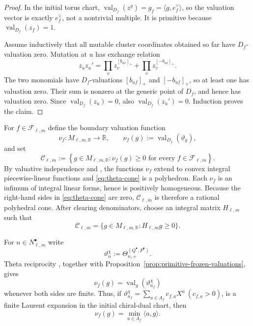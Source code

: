 \documentclass[11pt]{amsart}
\theoremstyle{definition}
\theoremstyle{remark}
\begin{document}
\begin{proof}
In the initial torus chart,
$\operatorname{val}_{D_f}(z^g)=g_f=\langle g,e_f^\vee\rangle$, 
so the valuation vector is exactly $e_f^\vee$, not a nontrivial multiple.
It is primitive because $\operatorname{val}_{D_f}(z_f)=1$.

Assume inductively that all mutable cluster coordinates obtained so far
have $D_f$-valuation zero.  Mutation at $u$
has exchange relation
\[ z_uz_u' =\prod_vz_v^{[b_{uv}]_+} +\prod_vz_v^{[-b_{uv}]_+}. \]
The two monomials have $D_f$-valuations $[b_{uf}]_+$ and
$[-b_{uf}]_+$, so at least one has valuation zero.  Their sum is nonzero at
the generic point of $D_f$, and hence has valuation zero.  Since
$\operatorname{val}_{D_f}(z_u)=0$, also
$\operatorname{val}_{D_f}(z_u')=0$.  Induction proves the claim.
\end{proof}

For $f\in\mathscr F_{\ell,m}$ define the boundary valuation function
\[ \nu_f:M_{\ell,m,\mathbb R}\longrightarrow\mathbb R, \qquad \nu_f(g):=\operatorname{val}_{D_f}(\vartheta_g), \]
and set
\begin{equation}
 \mathscr C_{\ell,m}
 :=\left\{g\in M_{\ell,m,\mathbb R}:
   \nu_f(g)\ge0\text{ for every }f\in\mathscr F_{\ell,m}\right\}.
 \label{eq:theta-cone}
\end{equation}
By valuative independence and
\cite[Theorem~1.1 and Corollary~1.2]{CMMM}, the functions $\nu_f$ extend to
convex integral piecewise-linear functions and \eqref{eq:theta-cone} is a
polyhedron.  Each $\nu_f$ is an infimum of integral linear forms, hence is
positively homogeneous.  Because the right-hand sides in
\eqref{eq:theta-cone} are zero, $\mathscr C_{\ell,m}$ is therefore a rational
polyhedral cone.  After clearing denominators, choose an integral matrix
$H_{\ell,m}$ such that
\[ \mathscr C_{\ell,m} =\{g\in M_{\ell,m,\mathbb R}:H_{\ell,m}g\ge0\}. \]

For $n\in N_{\ell,m}^{\bullet}$ write
\[ \vartheta_n^{\chi}:=\Theta_{n,+}^{(Q^{\bullet},P^{\bullet})}. \]
Theta reciprocity \cite[Claim~4.16 and Theorem~5.19]{CMMM}, together with
Proposition~\ref{prop:primitive-frozen-valuations}, gives
\[ \nu_f(g)=\operatorname{val}_{g}(\vartheta_{n_f}^{\chi}) \]
whenever both sides are finite.  Thus, if $\vartheta_{n_f}^{\chi}=\sum_{a\in A_f}c_{f,a}X^a \ (c_{f,a}>0)$,
is a finite Laurent expansion in the initial chiral-dual chart, then
\[ \nu_f(g)=\min_{a\in A_f}\langle a,g\rangle. \]
\end{document}
